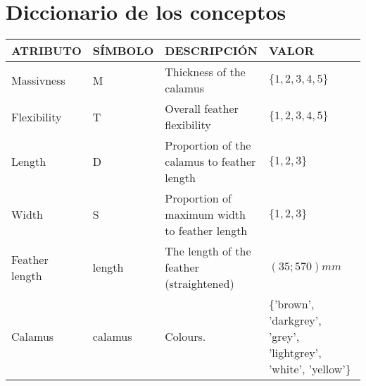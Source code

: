 \documentclass[a4paper,12pt]{article}
\begin{document}
\section{Diccionario de los conceptos}
\begin{table}[H]
	\centering
	\begin{tabular}{|p{0.2\linewidth}|p{0.15\linewidth}|p{0.25\linewidth}|p{0.45\linewidth}|}
		\hline
		ATRIBUTO       & SÍMBOLO      & DESCRIPCIÓN                                   & VALOR                                                                                                                                                                                                                           \\ \hline\hline
		Massivness     & M            & Thickness of the calamus                      & $\{1,2,3,4,5\}$                                                                                                                                                                                                                 \\ \hline
		Flexibility    & T            & Overall feather flexibility                   & $\{1,2,3,4,5\}$                                                                                                                                                                                                                 \\ \hline
		Length         & D            & Proportion of the calamus to feather length   & $\{1,2,3\}$                                                                                                                                                                                                                     \\ \hline
		Width          & S            & Proportion of maximum width to feather length & $\{1,2,3\}$                                                                                                                                                                                                                     \\ \hline
		Feather length & length       & The length of the feather (straightened)      & $(35;570) mm$                                                                                                                                                                                                                   \\ \hline
		Calamus        & calamus      & Colours.                                      & \{'brown', 'darkgrey', 'grey', 'lightgrey', 'white', 'yellow'\}                                                                                                                                                                 \\ \hline

\end{tabular}
\end{table}
\end{document}
